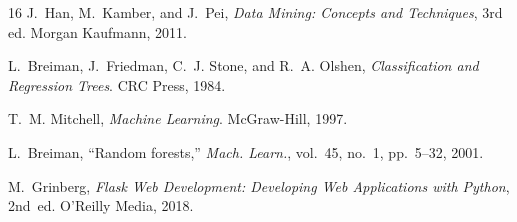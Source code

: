 \documentclass[conference]{IEEEtran}
\begin{document}
\begin{thebibliography}{16}
J.~Han, M.~Kamber, and J.~Pei, \textit{Data Mining: Concepts and Techniques}, 3rd ed. Morgan Kaufmann, 2011.

L.~Breiman, J.~Friedman, C.~J. Stone, and R.~A. Olshen, \textit{Classification and Regression Trees}. CRC Press, 1984.

T.~M. Mitchell, \textit{Machine Learning}. McGraw-Hill, 1997.

L.~Breiman, ``Random forests,'' \textit{Mach. Learn.}, vol.~45, no.~1, pp.~5--32, 2001.

M.~Grinberg, \textit{Flask Web Development: Developing Web Applications with Python}, 2nd~ed. O'Reilly Media, 2018.

\end{thebibliography}
\end{document}
